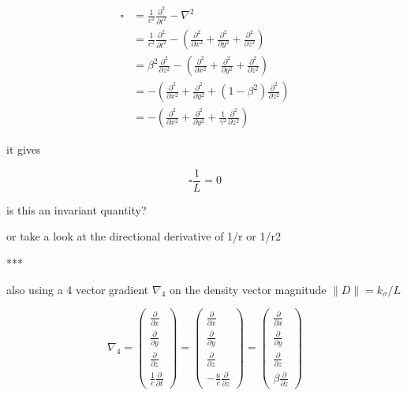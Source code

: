 \begin{equation}
	\begin{aligned}
		\square &= \frac{1}{c^2} \frac{\partial^2}{\partial t^2} - \nabla^2 \\
		& = \frac{1}{c^2} \frac{\partial^2}{\partial t^2} - \left( \frac{\partial^2}{\partial x^2} + \frac{\partial^2}{\partial y^2} + \frac{\partial^2}{\partial z^2} \right) \\
		& = \beta^2 \frac{\partial^2}{\partial z^2} - \left( \frac{\partial^2}{\partial x^2} + \frac{\partial^2}{\partial y^2} + \frac{\partial^2}{\partial z^2} \right) \\
		& =  - \left( \frac{\partial^2}{\partial x^2} + \frac{\partial^2}{\partial y^2} + (1-\beta^2) \frac{\partial^2}{\partial z^2} \right) \\
		& =  - \left( \frac{\partial^2}{\partial x^2} + \frac{\partial^2}{\partial y^2} + \frac{1}{\gamma^2} \frac{\partial^2}{\partial z^2} \right)
	\end{aligned}
\end{equation}

it gives

\begin{equation}
	\square \frac{1}{L} = 0
\end{equation}

is this an invariant quantity?


or take a look at the directional derivative of 1/r or 1/r2

***

also using a 4 vector gradient $\nabla_4$ on the density vector magnitude $\|D\| = k_\sigma / L$

\begin{equation}
	\nabla_4 = \begin{pmatrix}
		\frac{\partial}{\partial x} \\
		\frac{\partial}{\partial y} \\
		\frac{\partial}{\partial z} \\
		\frac{1}{c} \frac{\partial}{\partial t}
	\end{pmatrix}
	= \begin{pmatrix}
		\frac{\partial}{\partial x} \\
		\frac{\partial}{\partial y} \\
		\frac{\partial}{\partial z} \\
		-\frac{u}{c}\frac{\partial}{\partial z}
	\end{pmatrix}
	= \begin{pmatrix}
		\frac{\partial}{\partial x} \\
		\frac{\partial}{\partial y} \\
		\frac{\partial}{\partial z} \\
		\beta \frac{\partial}{\partial z}
	\end{pmatrix}
\end{equation}


